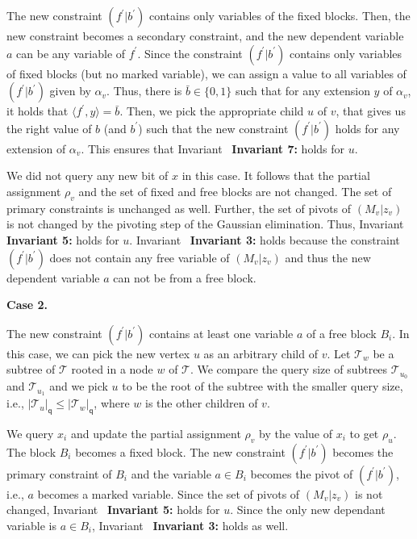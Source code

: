 The new constraint $(f^{\prime}|b^{\prime})$ contains only variables of the fixed blocks.
Then, the new constraint becomes a secondary constraint, and the new dependent variable $a$ can be any variable of $f^{\prime}$.
Since the constraint $(f^{\prime}|b^{\prime})$ contains only variables of fixed blocks (but no marked variable), we can assign a value to all variables of $(f^{\prime}|b^{\prime})$ given by $\alpha_{v}$.
Thus, there is $\bar{b}\in\{0,1\}$ such that for any extension $y$ of $\alpha_{v}$, it holds that $\langle f^{\prime},y\rangle=\bar{b}$.
Then, we pick the appropriate child $u$ of $v$, that gives us the right value of $b$ (and $b^{\prime}$) such that the new constraint $(f^{\prime}|b^{\prime})$ holds for any extension of $\alpha_{v}$. This ensures that Invariant \textbf{ Invariant 7:} holds for $u$.\par




We did not query any new bit of $x$ in this case.
It follows that the partial assignment $\rho_{v}$ and the set of fixed and free blocks are not changed.
The set of primary constraints is unchanged as well.
Further, the set of pivots of $(M_{v}|z_{v})$ is not changed by the pivoting step of the Gaussian elimination.
Thus, Invariant \textbf{ Invariant 5:} holds for $u$.
Invariant \textbf{ Invariant 3:} holds because the constraint $(f^{\prime}|b^{\prime})$ does not contain any free variable of $(M_{v}|z_{v})$ and thus the new dependent variable $a$ can not be from a free block.\par





\par\medskip\noindent\textbf{Case 2.}\par




The new constraint $(f^{\prime}|b^{\prime})$ contains at least one variable $a$ of a free block $B_{i}$.
In this case, we can pick the new vertex $u$ as an arbitrary child of $v$.
Let $\mathcal{T}_{w}$ be a subtree of $\mathcal{T}$ rooted in a node $w$ of $\mathcal{T}$.
We compare the query size of subtrees $\mathcal{T}_{u_{0}}$ and $\mathcal{T}_{u_{1}}$ and we pick $u$ to be the root of the subtree with the smaller query size, i.e., $|\mathcal{T}_{u}|_{\mathsf{q}}\leq|\mathcal{T}_{w}|_{\mathsf{q}}$, where $w$ is the other children of $v$.\par




We query $x_{i}$ and update the partial assignment $\rho_{v}$ by the value of $x_{i}$ to get $\rho_{u}$.
The block $B_{i}$ becomes a fixed block.
The new constraint $(f^{\prime}|b^{\prime})$ becomes the primary constraint of $B_{i}$ and the variable $a\in B_{i}$ becomes the pivot of $(f^{\prime}|b^{\prime})$, i.e., $a$ becomes a marked variable.
Since the set of pivots of $(M_{v}|z_{v})$ is not changed, Invariant \textbf{ Invariant 5:} holds for $u$.
Since the only new dependant variable is $a\in B_{i}$, Invariant \textbf{ Invariant 3:} holds as well.\par




